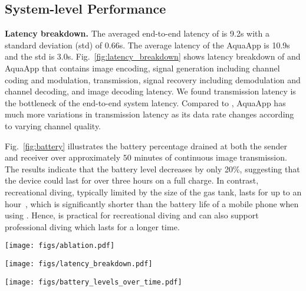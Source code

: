\subsection{System-level Performance}\label{sec:eval_system_metrics}

\noindent\textbf{Latency breakdown.}
The averaged end-to-end latency of \sysname is 9.2s with a standard deviation (std) of 0.66s. The average latency of the AquaApp is 10.9s and the std is 3.0s. Fig.~\ref{fig:latency_breakdown} shows latency breakdown of \sysname and AquaApp that contains image encoding, signal generation including channel coding and modulation, transmission, signal recovery including demodulation and channel decoding, and image decoding latency. We found transmission latency is the bottleneck of the end-to-end system latency. Compared to \sysname, AquaApp has much more variations in transmission latency as its data rate changes according to varying channel quality.



Fig.~\ref{fig:battery} illustrates the battery percentage drained at both the sender and receiver over approximately $50$ minutes of continuous image transmission. The results indicate that the battery level decreases by only 20\%, suggesting that the device could last for over three hours on a full charge. In contrast, recreational diving, typically limited by the size of the gas tank, lasts for up to an hour~\cite{mantacabo_scubadiving}, which is significantly shorter than the battery life of a mobile phone when using \sysname. Hence, \sysname is practical for recreational diving and can also support professional diving which lasts for a longer time.

\begin{figure*}[t]
    \centering
    \begin{minipage}{0.33\textwidth}
        \centering
        \texttt{[image: figs/ablation.pdf]}
        \caption{Ablation results at PHY.}
        \label{fig:eval_ablation}
    \end{minipage}\hfill
    \begin{minipage}{0.33\textwidth}
        \centering
        \texttt{[image: figs/latency\_breakdown.pdf]}
        \caption{Latency breakdown.}
        \label{fig:latency_breakdown}
    \end{minipage}\hfill
    \begin{minipage}{0.33\textwidth}
        \centering
        \texttt{[image: figs/battery\_levels\_over\_time.pdf]}
        \caption{Battery drain over time.}
        \label{fig:battery}
    \end{minipage}
\end{figure*}




























